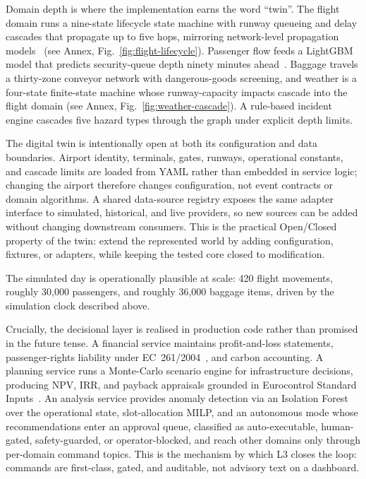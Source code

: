 \documentclass[runningheads]{llncs}
\begin{document}
Domain depth is where the implementation earns the word ``twin''. The flight domain runs a nine-state lifecycle state machine with runway queueing and delay cascades that propagate up to five hops, mirroring network-level propagation models~\cite{pyrgiotis2013} (see Annex, Fig.~\ref{fig:flight-lifecycle}). Passenger flow feeds a LightGBM model that predicts security-queue depth ninety minutes ahead~\cite{ke2017,schultz2019}. Baggage travels a thirty-zone conveyor network with dangerous-goods screening, and weather is a four-state finite-state machine whose runway-capacity impacts cascade into the flight domain (see Annex, Fig.~\ref{fig:weather-cascade}). A rule-based incident engine cascades five hazard types through the graph under explicit depth limits.

The digital twin is intentionally open at both its configuration and data boundaries. Airport identity, terminals, gates, runways, operational constants, and cascade limits are loaded from YAML rather than embedded in service logic; changing the airport therefore changes configuration, not event contracts or domain algorithms. A shared data-source registry exposes the same adapter interface to simulated, historical, and live providers, so new sources can be added without changing downstream consumers. This is the practical Open/Closed property of the twin: extend the represented world by adding configuration, fixtures, or adapters, while keeping the tested core closed to modification.

The simulated day is operationally plausible at scale: 420 flight movements, roughly 30{,}000 passengers, and roughly 36{,}000 baggage items, driven by the simulation clock described above.

Crucially, the decisional layer is realised in production code rather than promised in the future tense. A financial service maintains profit-and-loss statements, passenger-rights liability under EC~261/2004~\cite{eu261}, and carbon accounting. A planning service runs a Monte-Carlo scenario engine for infrastructure decisions, producing NPV, IRR, and payback appraisals grounded in Eurocontrol Standard Inputs~\cite{eurocontrol2024}. An analysis service provides anomaly detection via an Isolation Forest over the operational state, slot-allocation MILP, and an autonomous mode whose recommendations enter an approval queue, classified as auto-executable, human-gated, safety-guarded, or operator-blocked, and reach other domains only through per-domain command topics. This is the mechanism by which L3 closes the loop: commands are first-class, gated, and auditable, not advisory text on a dashboard.
\end{document}
